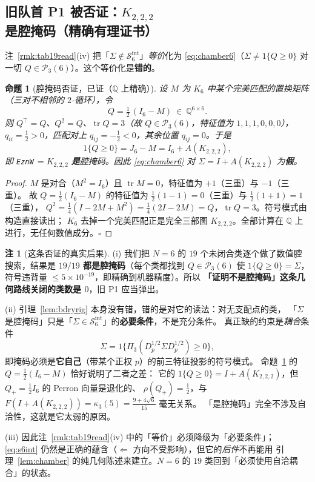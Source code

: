 \documentclass[UTF8,11pt]{ctexart}
\newtheorem{proposition}[theorem]{命题}
\theoremstyle{definition}
\newtheorem{remark}[theorem]{注}
\newcommand{\tr}{\operatorname{tr}}
\newcommand{\Q}{\mathbb{Q}}
\begin{document}
\subsection{旧队首 P1 被否证：$K_{2,2,2}$ 是腔掩码（精确有理证书）}\label{sec:chamberdead}

注~\ref{rmk:tab19read}(iv) 把「$\Sigma\notin\mathcal S_6^{\mathrm{int}}$」\emph{等价}化为
\eqref{eq:chamber6}（$\Sigma\ne1\{Q\ge0\}$ 对一切 $Q\in\mathcal P_3(6)$）。这个等价化是\textbf{错的}。

\begin{proposition}[腔掩码否证，已证（$\Q$ 上精确）]\label{prop:chamberdead}
设 $M$ 为 $K_6$ 中某个完美匹配的置换矩阵（三对不相邻的 $2$-循环），令
\[
Q=\tfrac12\,(I_6-M)\ \in\ \Q^{6\times6}.
\]
则 $Q^\top=Q$、$Q^2=Q$、$\tr Q=3$（故 $Q\in\mathcal P_3(6)$，特征值为 $1,1,1,0,0,0$），
$q_{ii}=\frac12>0$，匹配对上 $q_{ij}=-\frac12<0$，其余位置 $q_{ij}=0$。于是
\[
1\{Q\ge0\}=J_6-M=I_6+A(K_{2,2,2}),
\]
即 \texttt{EznW}$\,=K_{2,2,2}$ \textbf{是}腔掩码。因此 \eqref{eq:chamber6} 对 $\Sigma=I+A(K_{2,2,2})$ 为\textbf{假}。
\end{proposition}

\begin{proof}
$M$ 是对合（$M^2=I_6$）且 $\tr M=0$，特征值为 $+1$（三重）与 $-1$（三重）。
故 $Q=\frac12(I_6-M)$ 的特征值为 $\frac12(1-1)=0$（三重）与 $\frac12(1+1)=1$（三重），
$Q^2=\frac14(I-2M+M^2)=\frac14(2I-2M)=Q$，$\tr Q=3$。符号模式由构造直接读出；
$K_6$ 去掉一个完美匹配正是完全三部图 $K_{2,2,2}$。全部计算在 $\Q$ 上进行，无任何数值成分。$\square$
\end{proof}

\begin{remark}[这条否证的真实后果]\label{rmk:chamberdead}
(i) 我们把 $N=6$ 的 $19$ 个未闭合类逐个做了数值腔搜索，结果是
\textbf{$19/19$ 都是腔掩码}（每个类都找到 $Q\in\mathcal P_3(6)$ 使 $1\{Q\ge0\}=\Sigma$，
符号违背量 $\le5\times10^{-19}$，即精确到机器精度）。所以
\textbf{「证明不是腔掩码」这条几何路线关闭的类数是 $0$}，旧 P1 应当弹出。

(ii) 引理~\ref{lem:bdryrig} 本身没有错，错的是对它的读法：对无支配点的类，
「$\Sigma$ 是腔掩码」只是「$\Sigma\in\mathcal S_6^{\mathrm{int}}$」的\textbf{必要条件}，不是充分条件。
真正缺的约束是\emph{耦合}条件
\[
\Sigma=1\bigl\{\Pi_3(D_p^{1/2}\Sigma D_p^{1/2})\ge0\bigr\},
\]
即掩码必须是\textbf{它自己}（带某个正权 $p$）的前三特征投影的符号模式。
命题~\ref{prop:chamberdead} 的 $Q=\frac12(I_6-M)$ 恰好说明了二者之差：
它的 $1\{Q\ge0\}=I+A(K_{2,2,2})$，但 $Q_+=\frac12I_6$ 的 Perron 向量是退化的、
$\rho(Q_+)=\frac12$，与 $F(I+A(K_{2,2,2}))=\kappa_3(5)=\frac{9+4\sqrt6}{15}$ 毫无关系。
「是腔掩码」完全不涉及自洽性，这就是它太弱的原因。

(iii) 因此注~\ref{rmk:tab19read}(iv) 中的「等价」必须降级为「必要条件」；
\eqref{eq:s6int} 仍然是正确的蕴含（$\Leftarrow$ 方向不受影响），但它的\emph{后件}不再能用
引理~\ref{lem:chamber} 的纯几何陈述来建立。$N=6$ 的 $19$ 类回到「必须使用自洽耦合」的状态。
\end{remark}
\end{document}
